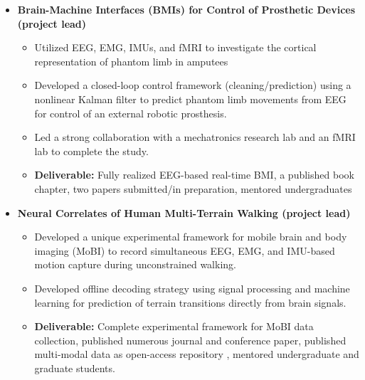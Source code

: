 \begin{adjustwidth}{0.5em}{0pt}
    \begin{itemize}
    \item[\color{accent}\ding{224}] {\color{emphasis}\textbf{Brain-Machine Interfaces (BMIs) for Control of Prosthetic Devices (project lead) }}\\
    \smallskip
        \begin{itemize}
            \item Utilized EEG, EMG, IMUs, and fMRI to investigate the cortical representation of phantom limb in amputees 
            \item Developed a closed-loop control framework (cleaning/prediction) using a nonlinear Kalman filter to predict phantom limb movements from EEG for control of an external robotic prosthesis. 
            \item Led a strong collaboration with a mechatronics research lab and an fMRI lab to complete the study. 
            \item {\color{pink} \textbf{Deliverable:}} Fully realized EEG-based real-time BMI, a published book chapter, two papers submitted/in preparation, mentored undergraduates
        \end{itemize}
    \medskip    
    
    \item[\color{accent}\ding{224}] {\color{emphasis}\textbf{Neural Correlates of Human Multi-Terrain Walking (project lead) \hspace{10pt} }}\\
    \smallskip
        \begin{itemize}
            \item Developed a unique experimental framework for mobile brain and body imaging (MoBI) to record simultaneous EEG, EMG, and IMU-based motion capture during unconstrained walking.
            \item Developed offline decoding strategy using signal processing and machine learning for prediction of terrain transitions directly from brain signals.
            \item {\color{pink} \textbf{Deliverable:}} Complete experimental framework for MoBI data collection, published numerous journal and conference paper, published multi-modal data as open-access repository \href{https://figshare.com/articles/EEG_Data/5616109/5}{\faFloppyO}, mentored undergraduate and graduate students.
        \end{itemize}
    \medskip   
    

\end{itemize}
\end{adjustwidth}
